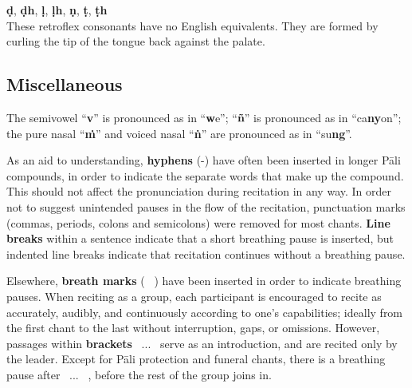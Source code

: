 \begin{justify}
  \textbf{ḍ}, \textbf{ḍh}, \textbf{ḷ}, \textbf{ḷh}, \textbf{ṇ}, \textbf{ṭ}, \textbf{ṭh}\\
  These retroflex consonants have no English equivalents. They are formed by curling the tip of the tongue back against the palate.
\end{justify}

\clearpage

\subsection*{Miscellaneous}
\begin{justify}
  The semivowel ``\textbf{v}'' is pronounced as in ``\textbf{w}e''; ``\textbf{ñ}'' is pronounced as in ``ca\textbf{ny}on''; the pure nasal ``\textbf{ṁ}'' and voiced nasal ``\textbf{ṅ}'' are pronounced as in ``su\textbf{ng}''.
\end{justify}

\begin{justify}
  As an aid to understanding, \textbf{hyphens} (-) have often been inserted in longer Pāli compounds, in order to indicate the separate words that make up the compound. This should not affect the pronunciation during recitation in any way. In order not to suggest unintended pauses in the flow of the recitation, punctuation marks (commas, periods, colons and semicolons) were removed for most chants. \textbf{Line breaks} within a sentence indicate that a short breathing pause is inserted, but indented line breaks indicate that recitation continues without a breathing pause.
\end{justify}

\begin{justify}
  Elsewhere, \textbf{breath marks} ( \abbrbreathmark\ ) have been inserted in order to indicate breathing pauses. When reciting as a group, each participant is encouraged to recite as accurately, audibly, and continuously according to one's capabilities; ideally from the first chant to the last without interruption, gaps, or omissions. However, passages within \textbf{brackets} \anglebracketleft\ \hspace{-0.5mm}... \hspace{-0.8mm}\anglebracketright\ serve as an introduction, and are recited only by the leader. Except for Pāli protection and funeral chants, there is a breathing pause after \anglebracketleft\ \hspace{-0.5mm}... \hspace{-0.8mm}\anglebracketright\ , before the rest of the group joins in.
\end{justify}

\clearpage

